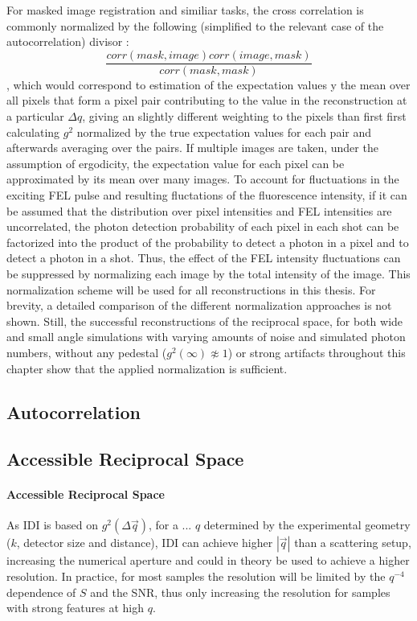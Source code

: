 For masked image registration and similiar tasks, the cross correlation is commonly normalized by the following (simplified to the relevant case of the autocorrelation) divisor \cite{padfield2010}:
\begin{equation}
\frac{\mathit{corr}(\mathit{mask},\mathit{image}) \mathit{corr}(\mathit{image},\mathit{mask})}{\mathit{corr}(\mathit{mask},\mathit{mask})}
\end{equation}, which would correspond to estimation of the expectation values  y the mean over all pixels that form a pixel pair contributing to the value in the reconstruction at a particular $\Delta q$, giving an slightly different weighting to the pixels than first first calculating $g^2$ normalized by the true expectation values for each pair and afterwards averaging over the pairs.
If multiple images are taken, under the assumption of ergodicity, the expectation value for each pixel can be approximated by its mean over many images. To account for fluctuations in the exciting FEL pulse and resulting fluctations of the fluorescence intensity, if it can be assumed that the distribution over pixel intensities and FEL intensities are uncorrelated, the photon detection probability of each pixel in each shot can be factorized into the product of the probability to detect a photon in a pixel and to detect a photon in a shot. Thus, the effect of the FEL intensity fluctuations can be suppressed by normalizing each image by the total intensity of the image. This normalization scheme will be used for all reconstructions in this thesis.
For brevity, a detailed comparison of the different normalization approaches is not shown. Still, the successful reconstructions of the reciprocal space, for both wide and small angle simulations with varying amounts of noise and simulated photon numbers, without any pedestal ($g^2(\infty)\not\approx 1$) or strong artifacts throughout this chapter show that the applied normalization is sufficient.  

\subsection{Autocorrelation}

\subsection{Accessible Reciprocal Space}
	\paragraph{Accessible Reciprocal Space}
	As IDI is based on $g^2(\Delta \vec{q})$, for a ...  $q$ determined by the experimental geometry ($k$, detector size and distance), IDI can achieve higher $\left|\vec{q}\right|$ than a scattering setup, increasing the numerical aperture and could in theory be used to achieve a higher resolution. In practice, for most samples the resolution will be limited by the $q^{-4}$ dependence of $S$ and the SNR, thus only increasing the resolution for samples with strong features at high $q$.
	
